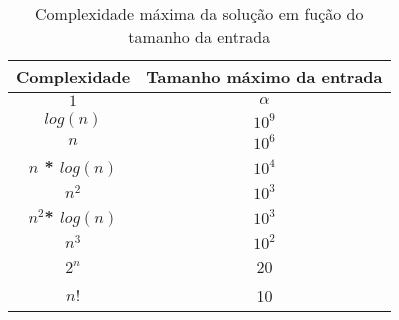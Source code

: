\begin{table}
\center
\begin{tabular}{|c|c|}
\hline
\textbf{Complexidade} & \textbf{Tamanho máximo da entrada} \\ \hline
\textbf{$1$} & $\alpha$ \\ \hline
\textbf{$log(n)$} & $10^9$ \\ \hline
\textbf{$n$} & $10^6$ \\ \hline
\textbf{$n$ * $log(n)$} & $10^4$ \\ \hline
\textbf{$n^2$} & $10^3$ \\ \hline
\textbf{$n^2$* $log(n)$} & $10^3$  \\ \hline
\textbf{$n^3$} & $10^2$ \\ \hline
\textbf{$2^n$} &  20 \\ \hline
\textbf{$n!$} &  10 \\ \hline
\end{tabular}
\caption{Complexidade máxima da solução em fução do tamanho da entrada}
\label{entradaXComplexidadeMaxima}
\end{table}
